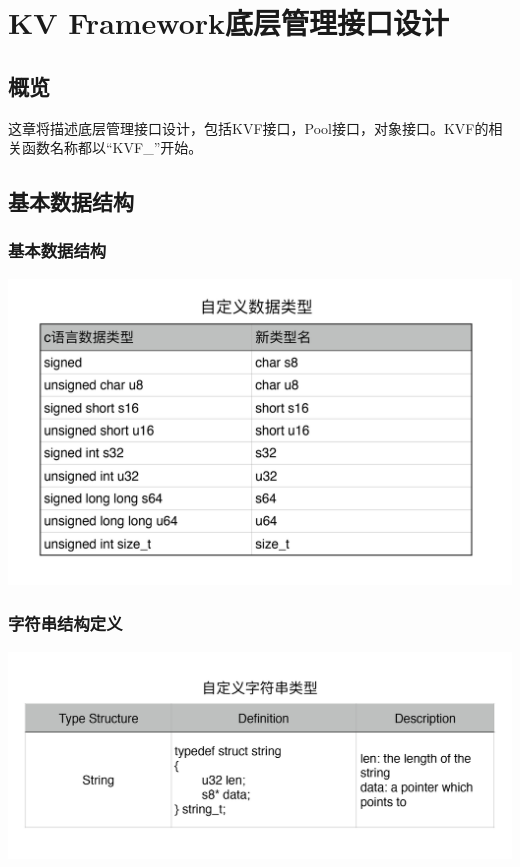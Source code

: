 \chapter{KV Framework底层管理接口设计}
\section{概览}\label{sec:Overview}
	这章将描述底层管理接口设计，包括KVF接口，Pool接口，对象接口。KVF的相关函数名称都以“KVF\_”开始。
\section{基本数据结构}\label{sec:KVF-Basic-Data-Structure}
	
	\subsection{基本数据结构}
		\begin{center}
			\includegraphics[width=13.9cm]{img/figure4.pdf}
		\end{center}
	\subsection{字符串结构定义}
		\begin{center}
			\includegraphics[width=13.9cm]{img/figure5.pdf}
		\end{center}

